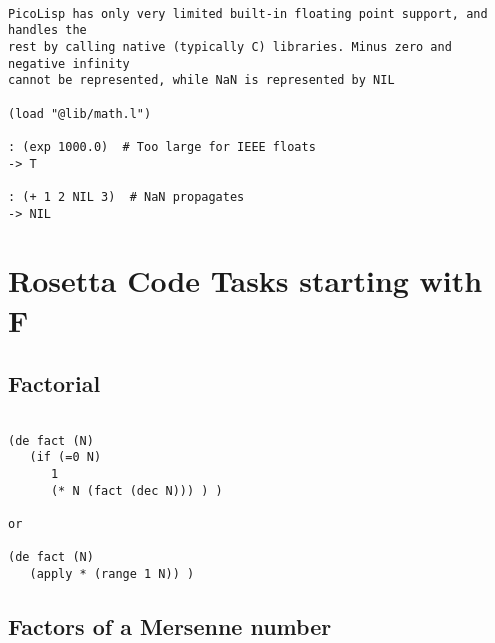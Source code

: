 \begin{verbatim}

PicoLisp has only very limited built-in floating point support, and handles the
rest by calling native (typically C) libraries. Minus zero and negative infinity
cannot be represented, while NaN is represented by NIL

(load "@lib/math.l")

: (exp 1000.0)  # Too large for IEEE floats
-> T

: (+ 1 2 NIL 3)  # NaN propagates
-> NIL

\end{verbatim}

\chapter{Rosetta Code Tasks starting with F}

\section*{Factorial}

\begin{verbatim}

(de fact (N)
   (if (=0 N)
      1
      (* N (fact (dec N))) ) )

or

(de fact (N)
   (apply * (range 1 N)) )

\end{verbatim}

\section*{Factors of a Mersenne number}


